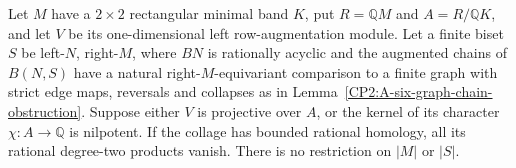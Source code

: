 \begin{theorem}
\label{CP2:A-projective-local-row-graph-obstruction}
Let $M$ have a $2\times2$ rectangular minimal band $K$, put
$R=\mathbb QM$ and $A=R/\mathbb QK$, and let $V$ be its one-dimensional
left row-augmentation module.  Let a finite biset $S$ be left-$N$,
right-$M$, where $BN$ is rationally acyclic and the augmented chains of
$B(N,S)$ have a natural right-$M$-equivariant comparison to a finite graph
with strict edge maps, reversals and collapses as in
Lemma~\ref{CP2:A-six-graph-chain-obstruction}.
Suppose either $V$ is projective over $A$, or the kernel of its character
$\chi:A\to\mathbb Q$ is nilpotent.
If the collage has bounded rational homology, all its rational
degree-two products vanish.  There is no restriction on $|M|$ or $|S|$.
\end{theorem}
